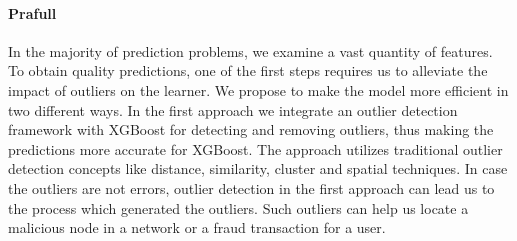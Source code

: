 \documentclass[runningheads]{llncs}
\begin{document}
\paragraph{Prafull} In the majority of prediction problems, we examine a vast quantity of features. To obtain quality predictions, one of the first steps requires us to alleviate the impact of outliers on the learner. We propose to make the model more efficient in two different ways. In the first approach we integrate an outlier detection framework with XGBoost for detecting and removing outliers, thus making the predictions more accurate for XGBoost. The approach utilizes traditional outlier detection concepts like distance, similarity, cluster and spatial techniques. In case the outliers are not errors, outlier detection in the first approach can lead us to the process which generated the outliers. Such outliers can help us locate a malicious node in a network or a fraud transaction for a user. 


\end{document}
